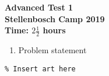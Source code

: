 \documentclass{article}
\begin{document}
\thispagestyle{empty}

\begin{center}
  \textbf{\Large Advanced Test 1}
  \\ \vspace{1em}
  \textbf{\large Stellenbosch Camp 2019}
  \\ \vspace{1em}
  \textbf{\large Time: $2\frac{1}{2}$ hours}
\end{center}


\begin{enumerate}[1.]

\item %
Problem statement

\end{enumerate}


\vfill
\begin{center} \begin{verbatim}
% Insert art here
\end{verbatim} \end{center}
\end{document}
